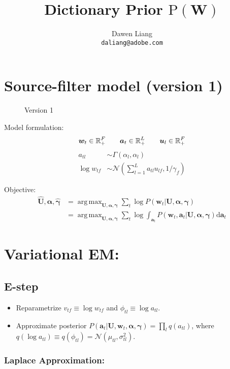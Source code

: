 \documentclass{article}
\title{Dictionary Prior $\mathrm{P}(\mathbf{W})$}
\author{
Dawen Liang \\
\texttt{daliang@adobe.com}
} \date{}
\DeclareMathOperator*{\argmax}{arg\,max}
\begin{document}
%
\maketitle
%

\section{Source-filter model (version 1)}
\begin{figure}[ht]
  \centering
      
  \caption{Version 1}
\label{fig:plate}
\end{figure}

Model formulation:
\[
\bm{w}_t \in \mathbb{R}_{+}^{F} \qquad \bm{a}_t \in \mathbb{R}_{+}^{L} \qquad \bm{u}_l  \in \mathbb{R}_{+}^{F}\\
\]
\begin{align*}
a_{tl} &\sim \Gamma(\alpha_l, \alpha_l)\\
\log {w}_{tf} &\sim \mathcal{N}(\sum_{l=1}^L a_{tl} u_{lf}, 1/\gamma_f)
\end{align*}

Objective:
\begin{align*}
\hat{\mathbf{U}}, \hat{\bm{\alpha}}, \hat{\bm{\gamma}} &= \argmax_{\mathbf{U}, \bm{\alpha}, \bm{\gamma}} \sum_t \log P(\bm{w}_t | \mathbf{U}, \bm{\alpha}, \bm{\gamma})\\
&= \argmax_{\mathbf{U}, \bm{\alpha}, \bm{\gamma}} \sum_t \log \int_{\bm{a}_t} P(\bm{w}_t, \bm{a}_t | \mathbf{U}, \bm{\alpha}, \bm{\gamma}) \mathrm{d} \bm{a}_t
\end{align*}


\section{Variational EM:}
\subsection{E-step}
\begin{itemize}
\item Reparametrize $v_{tf} \equiv \log w_{tf}$ and $\phi_{tl} \equiv \log a_{tl}$.
\item Approximate posterior $P(\bm{a}_t | \mathbf{U}, \bm{w}_t, \bm{\alpha}, \bm{\gamma}) = \prod_{l} q(a_{tl})$, where $q(\log a_{tl}) \equiv q(\phi_{tl}) = \mathcal{N}(\mu_{tl}, \sigma_{tl}^2)$.
\end{itemize}

\subsubsection{Laplace Approximation:} 
\end{document}
